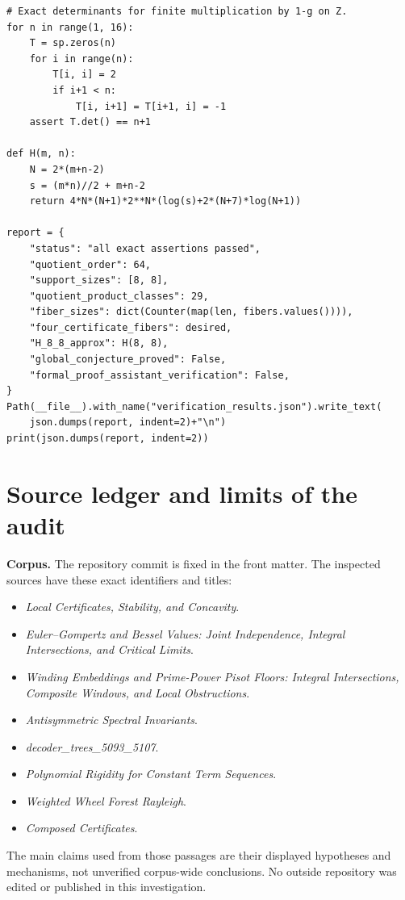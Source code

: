 \documentclass[11pt,a4paper,oneside]{report}
\theoremstyle{definition}
\theoremstyle{remark}
\begin{document}
\begin{lstlisting}
# Exact determinants for finite multiplication by 1-g on Z.
for n in range(1, 16):
    T = sp.zeros(n)
    for i in range(n):
        T[i, i] = 2
        if i+1 < n:
            T[i, i+1] = T[i+1, i] = -1
    assert T.det() == n+1

def H(m, n):
    N = 2*(m+n-2)
    s = (m*n)//2 + m+n-2
    return 4*N*(N+1)*2**N*(log(s)+2*(N+7)*log(N+1))

report = {
    "status": "all exact assertions passed",
    "quotient_order": 64,
    "support_sizes": [8, 8],
    "quotient_product_classes": 29,
    "fiber_sizes": dict(Counter(map(len, fibers.values()))),
    "four_certificate_fibers": desired,
    "H_8_8_approx": H(8, 8),
    "global_conjecture_proved": False,
    "formal_proof_assistant_verification": False,
}
Path(__file__).with_name("verification_results.json").write_text(
    json.dumps(report, indent=2)+"\n")
print(json.dumps(report, indent=2))
\end{lstlisting}

\section{Source ledger and limits of the audit}

\textbf{Corpus.} The repository commit is fixed in the front matter. The
inspected sources have these exact identifiers and titles:
\begin{itemize}
\item [043] \emph{Local Certificates, Stability, and Concavity}.
\item [044] \emph{Euler--Gompertz and Bessel Values: Joint Independence,
Integral Intersections, and Critical Limits}.
\item [049] \emph{Winding Embeddings and Prime-Power Pisot Floors:
Integral Intersections, Composite Windows, and Local Obstructions}.
\item [069] \emph{Antisymmetric Spectral Invariants}.
\item [085] \emph{decoder\_trees\_5093\_5107}.
\item [178] \emph{Polynomial Rigidity for Constant Term Sequences}.
\item [188] \emph{Weighted Wheel Forest Rayleigh}.
\item [193] \emph{Composed Certificates}.
\end{itemize}
The main claims used from those passages are their displayed hypotheses
and mechanisms, not unverified corpus-wide conclusions. No outside
repository was edited or published in this investigation.
\end{document}
